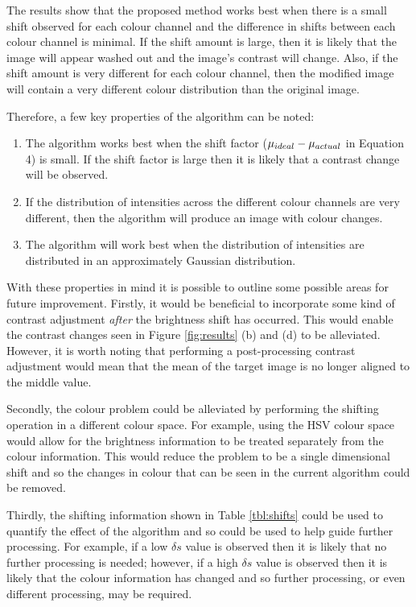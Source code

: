\documentclass[journal,transmag]{IEEEtran}
\begin{document}
The results show that the proposed method works best when there is a small shift observed for each colour channel and the difference in shifts between each colour channel is minimal.  If the shift amount is large, then it is likely that the image will appear washed out and the image's contrast will change.  Also, if the shift amount is very different for each colour channel, then the modified image will contain a very different colour distribution than the original image.   

Therefore, a few key properties of the algorithm can be noted:

\begin{enumerate}
\item The algorithm works best when the shift factor ($\mu_{\mbox{\tiny{ideal}}} - \mu_{\mbox{\tiny{actual}}}$ in Equation 4) is small.  If the shift factor is large then it is likely that a contrast change will be observed.
\item If the distribution of intensities across the different colour channels are very different, then the algorithm will produce an image with colour changes.
\item The algorithm will work best when the distribution of intensities are distributed in an approximately Gaussian distribution. 
\end{enumerate}

With these properties in mind it is possible to outline some possible areas for future improvement.  Firstly, it would be beneficial to incorporate some kind of contrast adjustment \emph{after} the brightness shift has occurred.  This would enable the contrast changes seen in Figure \ref{fig:results} (b) and (d) to be alleviated.  However, it is worth noting that performing a post-processing contrast adjustment would mean that the mean of the target image is no longer aligned to the middle value.

Secondly, the colour problem could be alleviated by performing the shifting operation in a different colour space.  For example, using the HSV colour space would allow for the brightness information to be treated separately from the colour information.  This would reduce the problem to be a single dimensional shift and so the changes in colour that can be seen in the current algorithm could be removed.

Thirdly, the shifting information shown in Table \ref{tbl:shifts} could be used to quantify the effect of the algorithm and so could be used to help guide further processing.  For example, if a low $\delta s$ value is observed then it is likely that no further processing is needed; however, if a high $\delta s$ value is observed then it is likely that the colour information has changed and so further processing, or even different processing, may be required.
\end{document}
